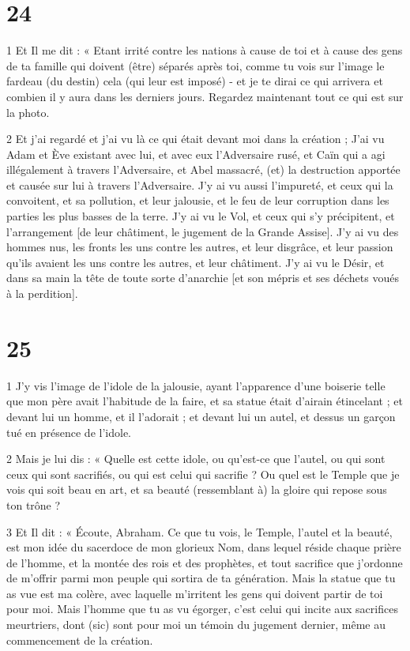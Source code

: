 \chapter{24}

\par 1 Et Il me dit : « Etant irrité contre les nations à cause de toi et à cause des gens de ta famille qui doivent (être) séparés après toi, comme tu vois sur l'image le fardeau (du destin) cela (qui leur est imposé) - et je te dirai ce qui arrivera et combien il y aura dans les derniers jours. Regardez maintenant tout ce qui est sur la photo.

\par 2 Et j'ai regardé et j'ai vu là ce qui était devant moi dans la création ; J'ai vu Adam et Ève existant avec lui, et avec eux l'Adversaire rusé, et Caïn qui a agi illégalement à travers l'Adversaire, et Abel massacré, (et) la destruction apportée et causée sur lui à travers l'Adversaire. J'y ai vu aussi l'impureté, et ceux qui la convoitent, et sa pollution, et leur jalousie, et le feu de leur corruption dans les parties les plus basses de la terre. J'y ai vu le Vol, et ceux qui s'y précipitent, et l'arrangement [de leur châtiment, le jugement de la Grande Assise]. J'y ai vu des hommes nus, les fronts les uns contre les autres, et leur disgrâce, et leur passion qu'ils avaient les uns contre les autres, et leur châtiment. J'y ai vu le Désir, et dans sa main la tête de toute sorte d'anarchie [et son mépris et ses déchets voués à la perdition].

\chapter{25}

\par 1 J'y vis l'image de l'idole de la jalousie, ayant l'apparence d'une boiserie telle que mon père avait l'habitude de la faire, et sa statue était d'airain étincelant ; et devant lui un homme, et il l'adorait ; et devant lui un autel, et dessus un garçon tué en présence de l'idole.

\par 2 Mais je lui dis : « Quelle est cette idole, ou qu'est-ce que l'autel, ou qui sont ceux qui sont sacrifiés, ou qui est celui qui sacrifie ? Ou quel est le Temple que je vois qui soit beau en art, et sa beauté (ressemblant à) la gloire qui repose sous ton trône ?

\par 3 Et Il dit : « Écoute, Abraham. Ce que tu vois, le Temple, l'autel et la beauté, est mon idée du sacerdoce de mon glorieux Nom, dans lequel réside chaque prière de l'homme, et la montée des rois et des prophètes, et tout sacrifice que j'ordonne de m'offrir parmi mon peuple qui sortira de ta génération. Mais la statue que tu as vue est ma colère, avec laquelle m'irritent les gens qui doivent partir de toi pour moi. Mais l'homme que tu as vu égorger, c'est celui qui incite aux sacrifices meurtriers, dont (sic) sont pour moi un témoin du jugement dernier, même au commencement de la création.

